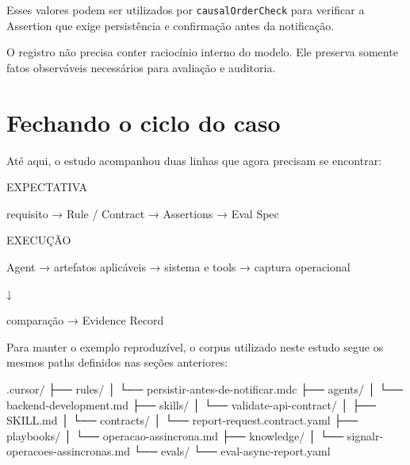 \documentclass[
  10pt,
  a4paper,
  oneside]{book}
\newenvironment{Shaded}{}{}
\newcommand{\NormalTok}[1]{#1}
\renewenvironment{Shaded}{\begin{snugshade}}{\end{snugshade}}%
\begin{document}
Esses valores podem ser utilizados por \texttt{causalOrderCheck} para
verificar a Assertion que exige persistência e confirmação antes da
notificação.

O registro não precisa conter raciocínio interno do modelo. Ele preserva
somente fatos observáveis necessários para avaliação e auditoria.

\hypertarget{fechando-o-ciclo-do-caso}{%
\section{Fechando o ciclo do caso}\label{fechando-o-ciclo-do-caso}}

Até aqui, o estudo acompanhou duas linhas que agora precisam se
encontrar:

\begin{Shaded}
\begin{Highlighting}[]
\NormalTok{EXPECTATIVA}

\NormalTok{requisito}
\NormalTok{→ Rule / Contract}
\NormalTok{→ Assertions}
\NormalTok{→ Eval Spec}

\NormalTok{EXECUÇÃO}

\NormalTok{Agent}
\NormalTok{→ artefatos aplicáveis}
\NormalTok{→ sistema e tools}
\NormalTok{→ captura operacional}

\NormalTok{        ↓}

\NormalTok{comparação}
\NormalTok{→ Evidence Record}
\end{Highlighting}
\end{Shaded}

Para manter o exemplo reproduzível, o corpus utilizado neste estudo
segue os mesmos paths definidos nas seções anteriores:

\begin{Shaded}
\begin{Highlighting}[]
\NormalTok{.cursor/}
\NormalTok{├── rules/}
\NormalTok{│   └── persistir{-}antes{-}de{-}notificar.mdc}
\NormalTok{├── agents/}
\NormalTok{│   └── backend{-}development.md}
\NormalTok{├── skills/}
\NormalTok{│   └── validate{-}api{-}contract/}
\NormalTok{│       ├── SKILL.md}
\NormalTok{│       └── contracts/}
\NormalTok{│           └── report{-}request.contract.yaml}
\NormalTok{├── playbooks/}
\NormalTok{│   └── operacao{-}assincrona.md}
\NormalTok{├── knowledge/}
\NormalTok{│   └── signalr{-}operacoes{-}assincronas.md}
\NormalTok{└── evals/}
\NormalTok{    └── eval{-}async{-}report.yaml}
\end{Highlighting}
\end{Shaded}
\end{document}
